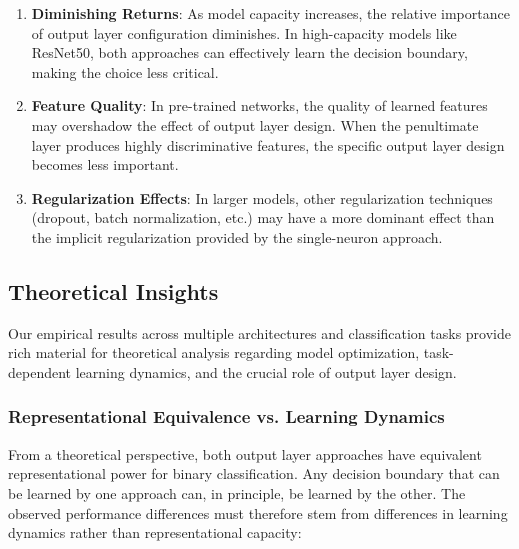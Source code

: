 \begin{enumerate}
\item \textbf{Diminishing Returns}: As model capacity increases, the relative importance of output layer configuration diminishes. In high-capacity models like ResNet50, both approaches can effectively learn the decision boundary, making the choice less critical.

\item \textbf{Feature Quality}: In pre-trained networks, the quality of learned features may overshadow the effect of output layer design. When the penultimate layer produces highly discriminative features, the specific output layer design becomes less important.

\item \textbf{Regularization Effects}: In larger models, other regularization techniques (dropout, batch normalization, etc.) may have a more dominant effect than the implicit regularization provided by the single-neuron approach.
\end{enumerate}

\subsection{Theoretical Insights}

Our empirical results across multiple architectures and classification tasks provide rich material for theoretical analysis regarding model optimization, task-dependent learning dynamics, and the crucial role of output layer design.

\subsubsection{Representational Equivalence vs. Learning Dynamics}

From a theoretical perspective, both output layer approaches have equivalent representational power for binary classification. Any decision boundary that can be learned by one approach can, in principle, be learned by the other. The observed performance differences must therefore stem from differences in learning dynamics rather than representational capacity:

